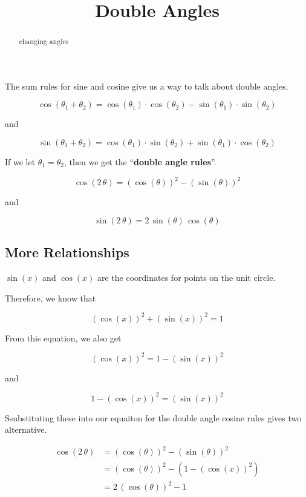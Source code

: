 \documentclass{ximera}
\title{Double Angles}
\begin{document}
\begin{abstract}
changing angles
\end{abstract}
\maketitle



The sum rules for sine and cosine give us a way to talk about double angles.




\[ \cos(\theta_1 + \theta_2) =  \cos(\theta_1) \cdot \cos(\theta_2) - \sin(\theta_1) \cdot \sin(\theta_2) \]

and

\[ \sin(\theta_1 + \theta_2) =  \cos(\theta_1) \cdot \sin(\theta_2) + \sin(\theta_1) \cdot \cos(\theta_2) \]





If we let $\theta_1 = \theta_2$, then we get the ``\textbf{double angle rules}''.



\[ \cos(2 \, \theta) =  (\cos(\theta))^2 - (\sin(\theta))^2  \]

and

\[ \sin(2 \, \theta) =  2 \, \sin(\theta) \,  \cos(\theta) \]












\subsection*{More Relationships}


$\sin(x)$ and $\cos(x)$ are the coordinates for points on the unit circle.

Therefore, we know that 

\[ (\cos(x))^2 + (\sin(x))^2 = 1\]


From this equation, we also get 


\[ (\cos(x))^2 = 1 - (\sin(x))^2 \]

and

\[ 1 - (\cos(x))^2 = (\sin(x))^2 \]


Ssubstituting these into our equaiton for the double angle cosine rules gives two alternative.


\begin{align*}
\cos(2 \, \theta) & = (\cos(\theta))^2 - (\sin(\theta))^2 \\
& = (\cos(\theta))^2 - (1 - (\cos(x))^2)  \\
& = 2 \, (\cos(\theta))^2 - 1
\end{align*}
\end{document}
